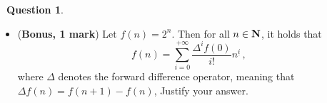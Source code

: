 \documentclass[10pt]{article}
\theoremstyle{definition}
\newtheorem{question}{{\normalfont \faGears}~Question}
\begin{document}
\begin{question}
\begin{enumerate}
\begin{itemize}
\begin{verbatim}
function p(x)
    return (y[1]
            + diff(y)[1] * x
            + 1/2 * diff(diff(y))[1] * x^2
            + 1/6 * diff(diff(diff(y)))[1] * x^3
end
        \end{verbatim}
            \item {(\textbf{Bonus, 1 mark})}
                Let $f(n) = 2^n$. Then for all $n \in \mathbf N$, it holds that
                \[
                    f(n) = \sum_{i=0}^{+\infty} \frac{\Delta^i f(0)}{i!} n^{\underline{i}} \, ,
                \]
                where $\Delta$ denotes the forward difference operator,
                meaning that $\Delta f(n) = f(n+1) - f(n)$,
                Justify your answer.
        \end{itemize}
\end{enumerate}
\end{question}
\end{document}
